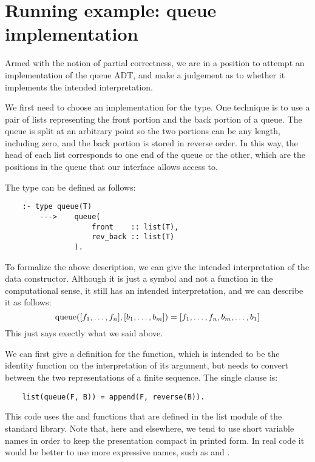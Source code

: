 \section{Running example: queue implementation}
\label{sec:queue-impl}

Armed with the notion of partial correctness,
we are in a position to attempt
an implementation of the queue ADT,
and make a judgement as to
whether it implements the intended interpretation.

We first need to choose an implementation for the  type.
One technique is to use a pair of lists
representing the front portion and the back portion of a queue.
The queue is split at an arbitrary point
so the two portions can be any length, including zero,
and the back portion is stored in reverse order.
In this way,
the head of each list corresponds to
one end of the queue or the other,
which are the positions in the queue
that our interface allows access to.

The type can be defined as follows:
\begin{verbatim}
    :- type queue(T)
        --->    queue(
                    front    :: list(T),
                    rev_back :: list(T)
                ).
\end{verbatim}
To formalize the above description,
we can give the intended interpretation of the 
data constructor.
Although it is just a symbol
and not a function in the computational sense,
it still has an intended interpretation,
and we can describe it as follows:
\[
    \operatorname{queue}([f_1, \ldots, f_n], [b_1, \ldots, b_m]) =
        [f_1, \ldots, f_n, b_m, \ldots, b_1]
\]
This just says exectly what we said above.

We can first give a definition for the  function,
which is intended to be the identity function
on the interpretation of its argument,
but needs to convert between the two representations
of a finite sequence.
The single clause is:
\begin{verbatim}
    list(queue(F, B)) = append(F, reverse(B)).
\end{verbatim}
This code uses
the  and  functions
that are defined in the list module of the standard library.
Note that, here and elsewhere,
we tend to use short variable names
in order to keep the presentation compact in printed form.
In real code it would be better to use more expressive names,
such as  and .

